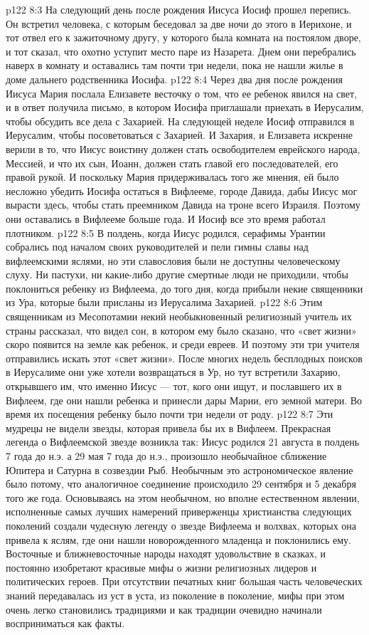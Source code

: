 \vs p122 8:3 На следующий день после рождения Иисуса Иосиф прошел перепись. Он встретил человека, с которым беседовал за две ночи до этого в Иерихоне, и тот отвел его к зажиточному другу, у которого была комната на постоялом дворе, и тот сказал, что охотно уступит место паре из Назарета. Днем они перебрались наверх в комнату и оставались там почти три недели, пока не нашли жилье в доме дальнего родственника Иосифа.
\vs p122 8:4 Через два дня после рождения Иисуса Мария послала Елизавете весточку о том, что ее ребенок явился на свет, и в ответ получила письмо, в котором Иосифа приглашали приехать в Иерусалим, чтобы обсудить все дела с Захарией. На следующей неделе Иосиф отправился в Иерусалим, чтобы посоветоваться с Захарией. И Захария, и Елизавета искренне верили в то, что Иисус воистину должен стать освободителем еврейского народа, Мессией, и что их сын, Иоанн, должен стать главой его последователей, его правой рукой. И поскольку Мария придерживалась того же мнения, ей было несложно убедить Иосифа остаться в Вифлееме, городе Давида, дабы Иисус мог вырасти здесь, чтобы стать преемником Давида на троне всего Израиля. Поэтому они оставались в Вифлееме больше года. И Иосиф все это время работал плотником.
\vs p122 8:5 \pc В полдень, когда Иисус родился, серафимы Урантии собрались под началом своих руководителей и пели гимны славы над вифлеемскими яслями, но эти славословия были не доступны человеческому слуху. Ни пастухи, ни какие\hyp{}либо другие смертные люди не приходили, чтобы поклониться ребенку из Вифлеема, до того дня, когда прибыли некие священники из Ура, которые были присланы из Иерусалима Захарией.
\vs p122 8:6 Этим священникам из Месопотамии некий необыкновенный религиозный учитель их страны рассказал, что видел сон, в котором ему было сказано, что «свет жизни» скоро появится на земле как ребенок, и среди евреев. И поэтому эти три учителя отправились искать этот «свет жизни». После многих недель бесплодных поисков в Иерусалиме они уже хотели возвращаться в Ур, но тут встретили Захарию, открывшего им, что именно Иисус --- тот, кого они ищут, и пославшего их в Вифлеем, где они нашли ребенка и принесли дары Марии, его земной матери. Во время их посещения ребенку было почти три недели от роду.
\vs p122 8:7 Эти мудрецы не видели звезды, которая привела бы их в Вифлеем. Прекрасная легенда о Вифлеемской звезде возникла так: Иисус родился 21 августа в полдень 7 года до н.э. а 29 мая 7 года до н.э., произошло необычайное сближение Юпитера и Сатурна в созвездии Рыб. Необычным это астрономическое явление было потому, что аналогичное соединение происходило 29 сентября и 5 декабря того же года. Основываясь на этом необычном, но вполне естественном явлении, исполненные самых лучших намерений приверженцы христианства следующих поколений создали чудесную легенду о звезде Вифлеема и волхвах, которых она привела к яслям, где они нашли новорожденного младенца и поклонились ему. Восточные и ближневосточные народы находят удовольствие в сказках, и постоянно изобретают красивые мифы о жизни религиозных лидеров и политических героев. При отсутствии печатных книг большая часть человеческих знаний передавалась из уст в уста, из поколение в поколение, мифы при этом очень легко становились традициями и как традиции очевидно начинали восприниматься как факты.
